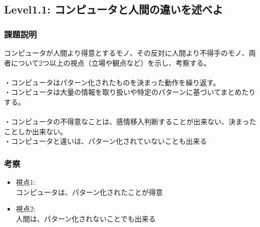 \subsection{Level1.1: コンピュータと人間の違いを述べよ}
\subsubsection{課題説明}
コンピュータが人間より得意とするモノ、その反対に人間より不得手のモノ、両者について2つ以上の視点（立場や観点など）を示し、考察する。\\
\\
・コンピュータはパターン化されたものを決まった動作を繰り返す。\\
・コンピュータは大量の情報を取り扱いや特定のパターンに基づいてまとめたりする。\\
\\
・コンピュータの不得意なことは、感情移入判断することが出来ない、決まったことしか出来ない。\\
・コンピュータと違いは、パターン化されていないことも出来る
\subsubsection{考察}
\begin{itemize}
 \item 視点1: \\
コンピュータは、パターン化されたことが得意\\
 \item 視点2: \\
人間は、パターン化されないことでも出来る
\end{itemize}

